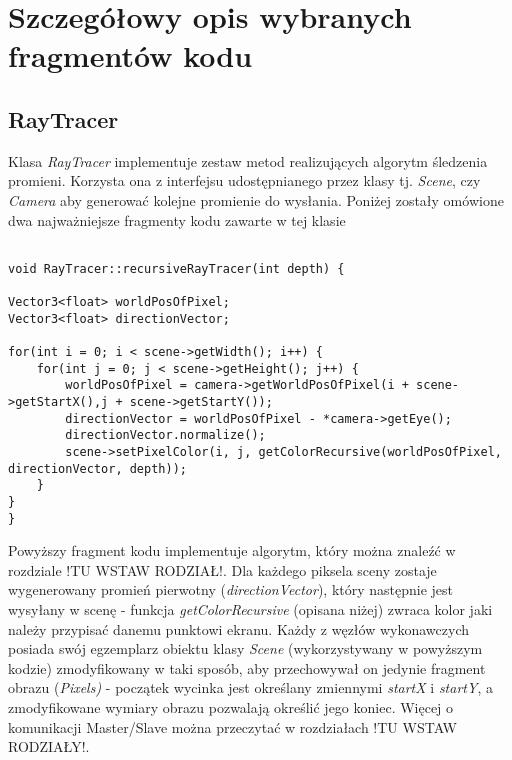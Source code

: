 \section{Szczegółowy opis wybranych fragmentów kodu}
	\subsection{RayTracer}

Klasa \emph{RayTracer} implementuje zestaw metod realizujących algorytm śledzenia promieni. Korzysta ona z interfejsu udostępnianego przez klasy tj. \emph{Scene}, czy \emph{Camera} aby generować kolejne promienie do wysłania. Poniżej zostały omówione dwa najważniejsze fragmenty kodu zawarte w tej klasie
	
\begin{lstlisting}

void RayTracer::recursiveRayTracer(int depth) {

Vector3<float> worldPosOfPixel;
Vector3<float> directionVector;

for(int i = 0; i < scene->getWidth(); i++) {
    for(int j = 0; j < scene->getHeight(); j++) {
        worldPosOfPixel = camera->getWorldPosOfPixel(i + scene->getStartX(),j + scene->getStartY());
        directionVector = worldPosOfPixel - *camera->getEye();
        directionVector.normalize();
        scene->setPixelColor(i, j, getColorRecursive(worldPosOfPixel, directionVector, depth));
    }
}
}
\end{lstlisting}	

Powyższy fragment kodu implementuje algorytm, który można znaleźć w rozdziale !TU WSTAW RODZIAŁ!. Dla każdego piksela sceny zostaje wygenerowany promień pierwotny (\emph{directionVector}), który następnie jest wysyłany w scenę - funkcja \emph{getColorRecursive} (opisana niżej) zwraca kolor jaki należy przypisać danemu punktowi ekranu. Każdy z węzłów wykonawczych posiada swój egzemplarz obiektu klasy \emph{Scene} (wykorzystywany w powyższym kodzie) zmodyfikowany w taki sposób, aby przechowywał on jedynie fragment obrazu (\emph{Pixels)} - początek wycinka jest określany zmiennymi \emph{startX} i \emph{startY}, a zmodyfikowane wymiary obrazu pozwalają określić jego koniec. Więcej o komunikacji Master/Slave można przeczytać w rozdziałach !TU WSTAW RODZIAŁY!. 

